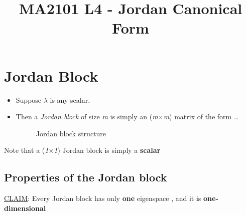 \documentclass{article}
\title{\vspace{-2cm} MA2101 L4 - Jordan Canonical Form}
\date{\vspace{-5ex}}
\begin{document}
\maketitle

\section{Jordan Block}
\begin{itemize}
    \item Suppose $\lambda$ is any scalar. 
    \item Then a \textit{Jordan block} of size \textit{m} is simply an (\textit{m}$\times$\textit{m}) matrix of the form \dots
    \begin{figure}[htp]%
        \centering
        \qquad
        \caption{Jordan block structure}%
    \end{figure}
\end{itemize}

Note that a (\textit{1}$\times$\textit{1}) Jordan block is simply a \textbf{scalar}

\subsection{Properties of the Jordan block}
\begin{large}
    \underline{CLAIM}: Every Jordan block has only \textbf{one} eigenspace , and it is \textbf{one-dimensional}
\end{large}
\end{document}
